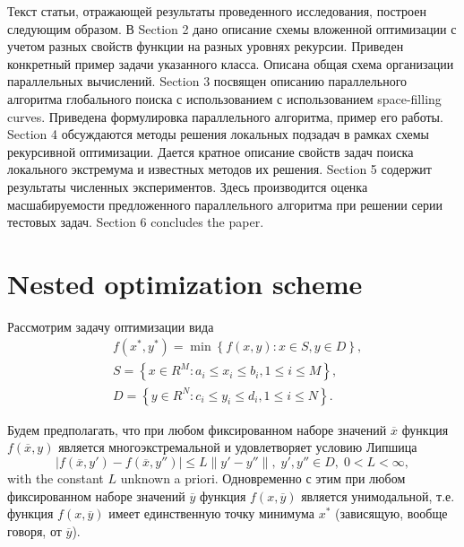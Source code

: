\documentclass{svproc}
\begin{document}
Текст статьи, отражающей результаты проведенного исследования, построен следующим образом. 
В Section 2 дано описание схемы вложенной оптимизации с учетом разных свойств функции на разных уровнях рекурсии. Приведен конкретный пример задачи указанного класса. Описана общая схема организации параллельных вычислений. 
Section 3 посвящен описанию параллельного алгоритма глобального поиска с использованием с использованием space-filling curves. Приведена формулировка параллельного алгоритма, пример его работы.
Section 4 обсуждаются методы решения локальных подзадач в рамках схемы рекурсивной оптимизации. Дается кратное описание свойств задач поиска локального экстремума и известных методов их решения. 
Section 5 содержит результаты численных экспериментов. Здесь производится оценка масшабируемости предложенного параллельного алгоритма при решении серии тестовых задач.  
Section 6 concludes the paper.


\section{Nested optimization scheme}

Рассмотрим задачу оптимизации вида
\begin{eqnarray}\label{main_problem}
& f(x^\ast,y^\ast)=\min{\left\{f(x,y):x\in S, y\in D\right\}}, \nonumber \\
& S=\left\{x\in R^M: a_i\leq x_i \leq b_i, 1\leq i \leq M\right\}, \\
& D=\left\{y\in R^N: c_i\leq y_i \leq d_i, 1\leq i \leq N\right\}. \nonumber
\end{eqnarray}

Будем предполагать, что при любом фиксированном наборе значений $\overline{x}$ функция $f(\overline{x},y)$ является многоэкстремальной и удовлетворяет условию Липшица
\[
\left|f(\overline{x},y')-f(\overline{x},y'')\right|\leq L\left\|y'-y''\right\|,\; y',y'' \in D,\; 0<L<\infty,
\]
with the constant $L$ unknown a priori.
Одновременно с этим при любом фиксированном наборе значений $\overline{y}$  функция $f(x,\overline{y})$ является унимодальной, т.е. функция $f(x,\overline{y})$ имеет единственную точку минимума $x^*$ (зависящую, вообще говоря, от $\overline{y}$). 
\end{document}
